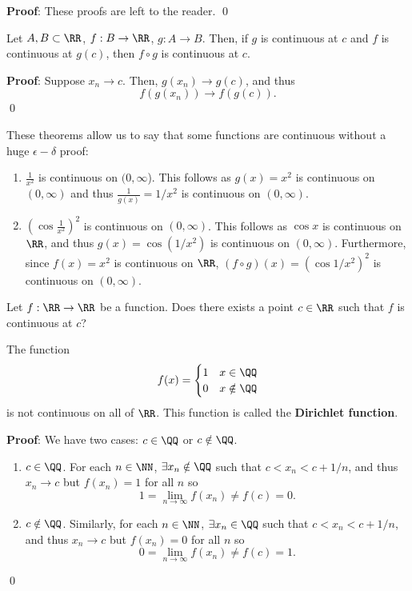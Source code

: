 \textbf{Proof}: These proofs are left to the reader. \qed 

\begin{theorem}
Let $A,B\subset \RR$, $f:B\to \RR$, $g:A\to B$. Then, if $g$ is continuous at $c$ and $f$ is continuous at $g(c)$, then $f\circ g$ is continuous at $c$. 
\end{theorem}
\textbf{Proof}: Suppose $x_n\to c$. Then, $g(x_n) \to g(c)$, and thus 
\[
f(g(x_n)) \to f(g(c)).
\]
\qed 

\begin{example}
These theorems allow us to say that some functions are continuous without a huge $\epsilon-\delta$ proof:
\begin{enumerate}[label = \roman*)]
    \item $\frac{1}{x^2}$ is continuous on $(0,\infty$). This follows as $g(x) = x^2$ is continuous on $(0,\infty)$ and thus $\frac{1}{g(x)} = 1/x^2$ is continuous on $(0,\infty)$. 
    \item $(\cos \frac{1}{x^2})^2$ is continuous on $(0,\infty)$. This follows as $\cos x$ is continuous on $\RR$, and thus $g(x) = \cos(1/x^2)$ is continuous on $(0,\infty)$. Furthermore, since $f(x) = x^2$ is continuous on $\RR$, $(f\circ g)(x) = (\cos 1/x^2)^2$ is continuous on $(0,\infty)$.
\end{enumerate}
\end{example}

\begin{question}
Let $f:\RR\to \RR$ be a function. Does there exists a point $c\in \RR$ such that $f$ is continuous at $c$?
\end{question}

\begin{theorem}
The function 
\[
f(x) = \begin{cases}1 & x\in \QQ \\ 0 &x\notin \QQ\end{cases}
\]
is not continuous on all of $\RR$. This function is called the \textbf{Dirichlet function}.
\end{theorem}
\textbf{Proof}: We have two cases: $c\in \QQ$ or $c\notin \QQ$.
\begin{enumerate}
    \item $c\in \QQ$. For each $n\in \NN$, $\exists x_n\notin \QQ$ such that $c< x_n < c+1/n$, and thus $x_n\to c$ but $f(x_n) =1$ for all $n$ so \[1 = \lim_{n\to \infty}f(x_n)\neq f(c) = 0.\]
    \item $c\notin \QQ$. Similarly, for each $n\in \NN$, $\exists x_n\in \QQ$ such that $c< x_n < c+1/n$, and thus $x_n\to c$ but $f(x_n) =0$ for all $n$ so \[0 = \lim_{n\to \infty}f(x_n)\neq f(c) = 1.\]
\end{enumerate}
\qed 

